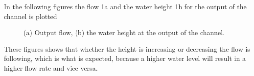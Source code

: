 In the following figures the flow \ref{fig:simulation_output_flow_height}a and the water height \ref{fig:simulation_output_flow_height}b for the output of the channel is plotted


\begin{figure}[H]
\centering
\begin{subfigure}{.5\textwidth}
  \centering
  
  \caption{}
\end{subfigure}%
\begin{subfigure}{.4\textwidth}
  \centering
 
  \caption{}
\end{subfigure}
\caption{(a) Output flow, (b) the water height at the output of the channel.}
\label{fig:simulation_output_flow_height}
\end{figure}

These figures shows that whether the height is increasing or decreasing the flow is following, which is what is expected, because a higher water level will result in a higher flow rate and vice versa. 


